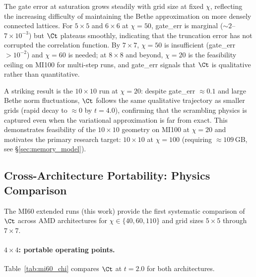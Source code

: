 The gate error at saturation grows steadily with grid size at fixed $\chi$,
reflecting the increasing difficulty of maintaining the Bethe approximation
on more densely connected lattices.
For $5\times5$ and $6\times6$ at $\chi=50$, gate\_err is marginal
($\sim 2$--$7\times10^{-3}$) but $\Ct$ plateaus smoothly, indicating that
the truncation error has not corrupted the correlation function.
By $7\times7$, $\chi=50$ is insufficient (gate\_err $> 10^{-2}$) and $\chi=60$
is needed; at $8\times8$ and beyond, $\chi=20$ is the feasibility ceiling on
MI100 for multi-step runs, and gate\_err signals that $\Ct$ is qualitative rather
than quantitative.

A striking result is the $10\times10$ run at $\chi=20$:
despite gate\_err $\approx 0.1$ and large Bethe norm fluctuations,
$\Ct$ follows the same qualitative trajectory as smaller grids
(rapid decay to $\approx 0$ by $t = 4.0$), confirming that the scrambling
physics is captured even when the variational approximation is far from exact.
This demonstrates feasibility of the $10\times10$ geometry on MI100 at $\chi=20$
and motivates the primary research target: $10\times10$ at $\chi=100$
(requiring $\approx109$\,GB, see §\ref{sec:memory_model}).

\subsection{Cross-Architecture Portability: Physics Comparison}
\label{sec:portability_physics}

The MI60 extended runs (this work) provide the first systematic comparison of
$\Ct$ across AMD architectures for $\chi \in \{40, 60, 110\}$ and grid sizes
$5\times5$ through $7\times7$.

\paragraph{$4\times4$: portable operating points.}
Table~\ref{tab:mi60_chi} compares $\Ct$ at $t=2.0$ for both architectures.

